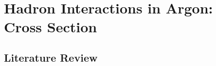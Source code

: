 \chapter{Hadron Interactions in Argon: Cross Section}\label{ch:Interactions}
\section{Literature Review}

 






